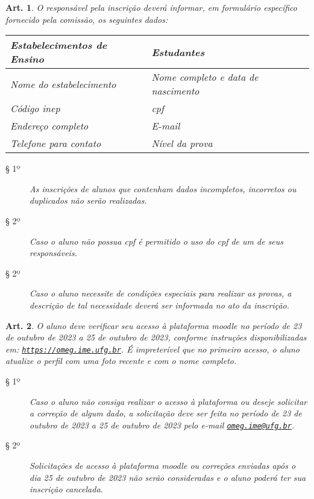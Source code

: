 \documentclass[a4paper,12pt]{article}
\makeatletter
\newtheorem{article}{Art.}
\def\url{https://omeg.ime.ufg.br}
\def\homepage{\href{\url}{\texttt{\url}}}
\def\emailaddres{omeg.ime@ufg.br}
\def\contactUs{\href{mailto:\emailaddres}{\texttt{\emailaddres}}}
\def\year{2023}
\def\testingAccessToThePlatformOpeningDate{23 de outubro de \year}
\def\testingAccessToThePlatformClosingDate{25 de outubro de \year}
\def\fixAccessCredentialsOpeningDate{23 de outubro de \year}
\def\fixAccessCredentialsClosingDate{25 de outubro de \year}
\makeatother
\begin{document}
\begin{article}
  O responsável pela inscrição deverá informar, em formulário específico
  fornecido pela comissão, os seguintes dados:

  \begin{table}[H]
    \centering
    \begin{tabular}{l|l}
      \textbf{Estabelecimentos de Ensino} & \textbf{Estudantes}                \\
      \hline
      Nome do estabelecimento             & Nome completo e data de nascimento \\
      Código \acrshort{inep}              & \acrshort{cpf}                     \\
      Endereço completo                   & E-mail                             \\
      Telefone para contato               & Nível da prova
    \end{tabular}
  \end{table}

  \begin{description}
    \item[§ 1º]
      As inscrições de alunos que contenham dados incompletos, incorretos ou
      duplicados não serão realizadas.
    \item[§ 2º]
      Caso o aluno não possua \acrshort{cpf} é permitido o uso do
      \acrshort{cpf} de um de seus responsáveis.
    \item[§ 2º]
      Caso o aluno necessite de condições especiais para realizar as provas,
      a descrição de tal necessidade deverá ser informada no ato da inscrição.
  \end{description}
\end{article}

\begin{article}
  O aluno deve verificar seu acesso à plataforma \acrshort{moodle} no período
  de \testingAccessToThePlatformOpeningDate{} a
  \testingAccessToThePlatformClosingDate, conforme instruções disponibilizadas
  em: \homepage. É impreterível que no primeiro acesso, o aluno atualize o
  perfil com uma foto recente e com o nome completo.
  \begin{description}
    \item[§ 1º]
      Caso o aluno não consiga realizar o acesso à plataforma ou deseje
      solicitar a correção de algum dado, a solicitação deve ser feita no
      período de \fixAccessCredentialsOpeningDate{} a
      \fixAccessCredentialsClosingDate{} pelo e-mail \contactUs.
    \item[§ 2º]
      Solicitações de acesso à plataforma \acrshort{moodle} ou correções
      enviadas após o dia \fixAccessCredentialsClosingDate{} não serão
      consideradas e o aluno poderá ter sua inscrição cancelada.
  \end{description}
\end{article}
\end{document}
